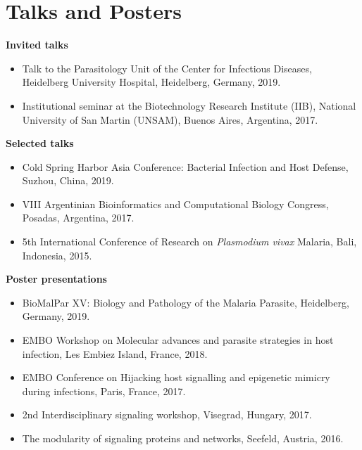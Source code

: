 \documentclass[11pt,a4paper,sans]{moderncv} %
\begin{document}
\section{Talks and Posters}
\vspace{-.1cm}
\textbf{Invited talks}
\begin{itemize}
  \item Talk to the Parasitology Unit of the Center for Infectious Diseases, Heidelberg University Hospital, Heidelberg, Germany, 2019.
  \item Institutional seminar at the Biotechnology Research Institute (IIB), National University of San Martin (UNSAM), Buenos Aires, Argentina, 2017.
\end{itemize}
\vspace{.1cm}
\textbf{Selected talks}
\begin{itemize}
  \item Cold Spring Harbor Asia Conference: Bacterial Infection and Host Defense, Suzhou, China, 2019.
  \item VIII Argentinian Bioinformatics and Computational Biology Congress, Posadas, Argentina, 2017.
  \item 5th International Conference of Research on \textit{Plasmodium vivax} Malaria, Bali, Indonesia, 2015.
\end{itemize}
\vspace{.1cm}
\textbf{Poster presentations}
\begin{itemize}
  \item BioMalPar XV: Biology and Pathology of the Malaria Parasite, Heidelberg, Germany, 2019.
  \item EMBO Workshop on Molecular advances and parasite strategies in host infection, Les Embiez Island, France, 2018.
  \item EMBO Conference on Hijacking host signalling and epigenetic mimicry during infections, Paris, France, 2017.
  \item 2nd Interdisciplinary signaling workshop, Visegrad, Hungary, 2017.
  \item The modularity of signaling proteins and networks, Seefeld, Austria, 2016.\\
\end{itemize}

\vspace{-.2cm}
\end{document}
